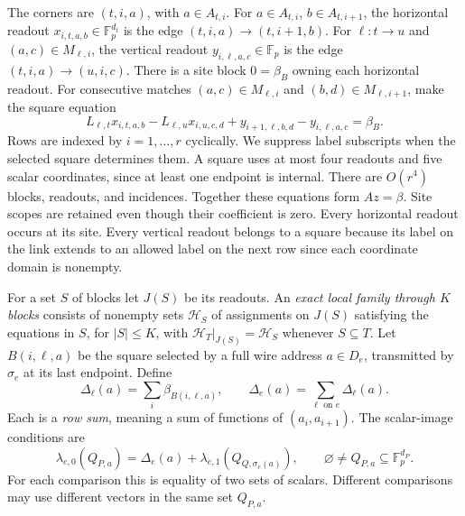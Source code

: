 \documentclass[11pt]{article}
\newcommand{\F}{\mathbb F_p}
\theoremstyle{definition}
\theoremstyle{remark}
\numberwithin{equation}{section}
\begin{document}
The corners are \((t,i,a)\), with \(a\in A_{t,i}\).
For \(a\in A_{t,i}\), \(b\in A_{t,i+1}\), the horizontal readout
\(x_{i,t,a,b}\in\F^{d_t}\) is the edge
\((t,i,a)\to(t,i+1,b)\).
For \(\ell:t\to u\) and \((a,c)\in M_{\ell,i}\), the vertical readout
\(y_{i,\ell,a,c}\in\F\) is the edge
\((t,i,a)\to(u,i,c)\).
There is a site block \(0=\beta_B\) owning each horizontal readout.
For consecutive matches \((a,c)\in M_{\ell,i}\) and
\((b,d)\in M_{\ell,i+1}\), make the square equation
\begin{equation}
 L_{\ell,t}x_{i,t,a,b}-L_{\ell,u}x_{i,u,c,d}
       +y_{i+1,\ell,b,d}-y_{i,\ell,a,c}=\beta_B.
 \label{hs:square}
\end{equation}
Rows are indexed by $i=1,\ldots,r$ cyclically. We suppress label subscripts when the selected square determines them.
A square uses at most four readouts and five
scalar coordinates, since at least one endpoint is internal.
There are \(O(r^4)\) blocks, readouts, and incidences.
Together these equations form \(Az=\beta\). Site scopes are retained
even though their coefficient is zero. Every horizontal readout occurs at its site.
Every vertical readout belongs to a square because its label on the link extends
to an allowed label on the next row since each coordinate domain is
nonempty.

For a set \(S\) of blocks let \(J(S)\) be its readouts.
An \emph{exact local family through \(K\) blocks} consists of nonempty
sets \(\mathcal H_S\) of assignments on \(J(S)\) satisfying the equations
in \(S\), for \(|S|\leq K\), with
\(\mathcal H_T|_{J(S)}=\mathcal H_S\) whenever \(S\subseteq T\).
Let \(B(i,\ell,a)\) be the square selected by a full wire address
\(a\in D_e\), transmitted by \(\sigma_e\) at its last endpoint.  Define
\[
 \Delta_\ell(a)=\sum_i\beta_{B(i,\ell,a)},\qquad
 \Delta_e(a)=\sum_{\ell\text{ on }e}\Delta_\ell(a).
\]
Each is a \emph{row sum}, meaning a sum of functions of
\((a_i,a_{i+1})\).  The scalar-image conditions are
\begin{equation}
 \lambda_{e,0}(Q_{P,a})
 =\Delta_e(a)+\lambda_{e,1}(Q_{Q,\sigma_e(a)}),
 \qquad \varnothing\neq Q_{P,a}\subseteq\F^{d_P}.
 \label{hs:images}
\end{equation}
For each comparison this is equality of two sets of scalars. Different comparisons may use different vectors in the same set $Q_{P,a}$.
\end{document}
